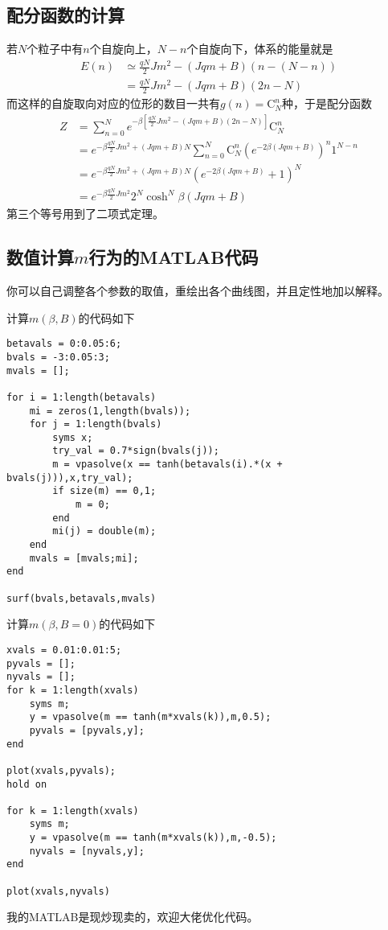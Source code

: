 \documentclass[a4paper,11pt]{ctexart}
\newcommand{\bea}{\begin{equation}\begin{aligned}}
\newcommand{\eea}{\end{aligned}\end{equation}}
\begin{document}
\subsection{配分函数的计算}
若$N$个粒子中有$n$个自旋向上，$N-n$个自旋向下，体系的能量就是
\bea
E(n) &\simeq \frac{qN}{2}Jm^2 - (Jqm+B)(n-(N-n))\\
&= \frac{qN}{2}Jm^2 - (Jqm+B)(2n-N)
\eea
而这样的自旋取向对应的位形的数目一共有$g(n) = \mathrm{C}_N^n$种，于是配分函数
\bea
Z &= \sum_{n=0}^N e^{-\beta[\frac{qN}{2}Jm^2 - (Jqm+B)(2n-N)]}\mathrm{C}_N^n\\
&= e^{-\beta \frac{qN}{2}Jm^2+(Jqm+B)N}\sum_{n=0}^N \mathrm{C}_N^n (e^{-2\beta(Jqm+B)})^n 1^{N-n} \\
&= e^{-\beta \frac{qN}{2}Jm^2+(Jqm+B)N}(e^{-2\beta(Jqm+B)}+1)^N\\
&= e^{-\beta \frac{qN}{2}Jm^2}2^N\cosh^N\beta(Jqm+B)
\eea
第三个等号用到了二项式定理。
\subsection{数值计算$m$行为的MATLAB代码}
你可以自己调整各个参数的取值，重绘出各个曲线图，并且定性地加以解释。
\par
计算$m(\beta,B)$的代码如下
\begin{verbatim}
betavals = 0:0.05:6;
bvals = -3:0.05:3;
mvals = [];

for i = 1:length(betavals)
    mi = zeros(1,length(bvals));
    for j = 1:length(bvals)
        syms x;
        try_val = 0.7*sign(bvals(j));
        m = vpasolve(x == tanh(betavals(i).*(x + bvals(j))),x,try_val);
        if size(m) == 0,1;
            m = 0;
        end
        mi(j) = double(m);
    end
    mvals = [mvals;mi];
end

surf(bvals,betavals,mvals)
\end{verbatim}
计算$m(\beta,B=0)$的代码如下
\begin{verbatim}
xvals = 0.01:0.01:5;
pyvals = [];
nyvals = [];
for k = 1:length(xvals)
    syms m;
    y = vpasolve(m == tanh(m*xvals(k)),m,0.5);
    pyvals = [pyvals,y];
end

plot(xvals,pyvals);
hold on

for k = 1:length(xvals)
    syms m;
    y = vpasolve(m == tanh(m*xvals(k)),m,-0.5);
    nyvals = [nyvals,y];
end

plot(xvals,nyvals)
\end{verbatim}
我的MATLAB是现炒现卖的，欢迎大佬优化代码。
\end{document}
